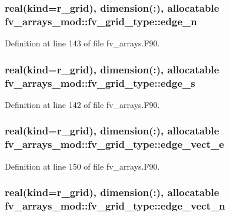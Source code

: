 \subsubsection[{edge\-\_\-n}]{\setlength{\rightskip}{0pt plus 5cm}real(kind={\bf r\-\_\-grid}), dimension(\-:), allocatable fv\-\_\-arrays\-\_\-mod\-::fv\-\_\-grid\-\_\-type\-::edge\-\_\-n}\label{structfv__arrays__mod_1_1fv__grid__type_a8be97319aa472a2e64777fd72af1efb3}


Definition at line 143 of file fv\-\_\-arrays.\-F90.

\subsubsection[{edge\-\_\-s}]{\setlength{\rightskip}{0pt plus 5cm}real(kind={\bf r\-\_\-grid}), dimension(\-:), allocatable fv\-\_\-arrays\-\_\-mod\-::fv\-\_\-grid\-\_\-type\-::edge\-\_\-s}\label{structfv__arrays__mod_1_1fv__grid__type_a0779d947f5dac37241bce29ace4319fb}


Definition at line 142 of file fv\-\_\-arrays.\-F90.

\subsubsection[{edge\-\_\-vect\-\_\-e}]{\setlength{\rightskip}{0pt plus 5cm}real(kind={\bf r\-\_\-grid}), dimension(\-:), allocatable fv\-\_\-arrays\-\_\-mod\-::fv\-\_\-grid\-\_\-type\-::edge\-\_\-vect\-\_\-e}\label{structfv__arrays__mod_1_1fv__grid__type_af14f0b8907ab53e5d8ed7df541aec6b9}


Definition at line 150 of file fv\-\_\-arrays.\-F90.

\subsubsection[{edge\-\_\-vect\-\_\-n}]{\setlength{\rightskip}{0pt plus 5cm}real(kind={\bf r\-\_\-grid}), dimension(\-:), allocatable fv\-\_\-arrays\-\_\-mod\-::fv\-\_\-grid\-\_\-type\-::edge\-\_\-vect\-\_\-n}\label{structfv__arrays__mod_1_1fv__grid__type_ae3fbc56118df0893995b5698166e622a}


